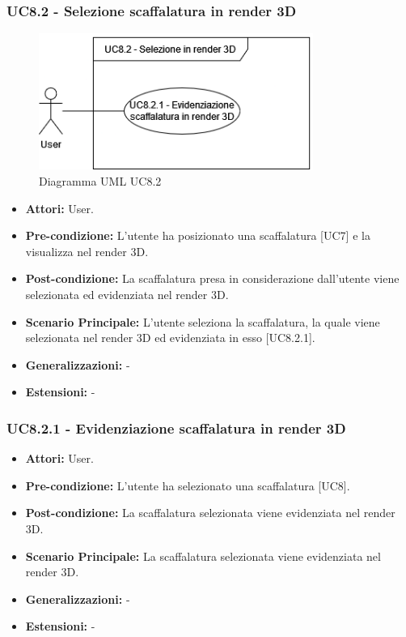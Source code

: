\subsubsection{UC8.2 - Selezione scaffalatura in render 3D}
\begin{figure}[H]
  \centering
  \includegraphics[width=0.8\textwidth]{UC_diagrams_1-10/UC8.2.drawio.png}
   \caption{Diagramma UML UC8.2}
\end{figure}
\begin{itemize}
    \item \textbf{Attori:} User.
    \item \textbf{Pre-condizione:} L'utente ha posizionato una scaffalatura [UC7] e la visualizza nel render 3D.
    \item \textbf{Post-condizione:} La scaffalatura presa in considerazione dall'utente viene selezionata ed evidenziata nel render 3D.
    \item \textbf{Scenario Principale:} L'utente seleziona la scaffalatura, la quale viene selezionata nel render 3D ed evidenziata in esso [UC8.2.1].
    \item \textbf{Generalizzazioni:} -
    \item \textbf{Estensioni:} -
\end{itemize}


\subsubsection{UC8.2.1 - Evidenziazione scaffalatura in render 3D}
\begin{itemize}
    \item \textbf{Attori:} User.
    \item \textbf{Pre-condizione:} L'utente ha selezionato una scaffalatura [UC8].
    \item \textbf{Post-condizione:} La scaffalatura selezionata viene evidenziata nel render 3D.
    \item \textbf{Scenario Principale:} La scaffalatura selezionata viene evidenziata nel render 3D.
    \item \textbf{Generalizzazioni:} -
    \item \textbf{Estensioni:} -
\end{itemize}